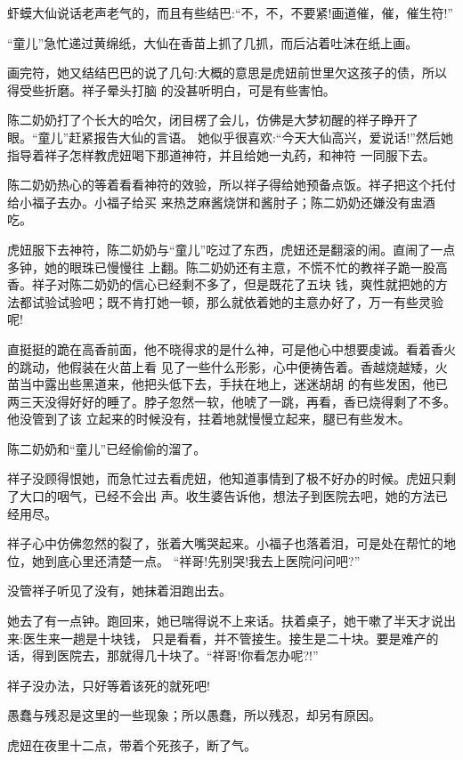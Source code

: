 \documentclass[11pt,a4paper,onecolumn]{article}
\begin{document}
虾蟆大仙说话老声老气的，而且有些结巴:``不，不，不要紧!画道催，催，催生符!''

``童儿''急忙递过黄绵纸，大仙在香苗上抓了几抓，而后沾着吐沫在纸上画。

画完符，她又结结巴巴的说了几句:大概的意思是虎妞前世里欠这孩子的债，所以得受些折磨。祥子晕头打脑
的没甚听明白，可是有些害怕。

陈二奶奶打了个长大的哈欠，闭目楞了会儿，仿佛是大梦初醒的祥子睁开了眼。``童儿''赶紧报告大仙的言语。
她似乎很喜欢:``今天大仙高兴，爱说话!''然后她指导着祥子怎样教虎妞喝下那道神符，并且给她一丸药，和神符
一同服下去。

陈二奶奶热心的等着看看神符的效验，所以祥子得给她预备点饭。祥子把这个托付给小福子去办。小福子给买
来热芝麻酱烧饼和酱肘子；陈二奶奶还嫌没有盅酒吃。

虎妞服下去神符，陈二奶奶与``童儿''吃过了东西，虎妞还是翻滚的闹。直闹了一点多钟，她的眼珠已慢慢往
上翻。陈二奶奶还有主意，不慌不忙的教祥子跪一股高香。祥子对陈二奶奶的信心已经剩不多了，但是既花了五块
钱，爽性就把她的方法都试验试验吧；既不肯打她一顿，那么就依着她的主意办好了，万一有些灵验呢!

直挺挺的跪在高香前面，他不晓得求的是什么神，可是他心中想要虔诚。看着香火的跳动，他假装在火苗上看
见了一些什么形影，心中便祷告着。香越烧越矮，火苗当中露出些黑道来，他把头低下去，手扶在地上，迷迷胡胡
的有些发困，他已两三天没得好好的睡了。脖子忽然一软，他唬了一跳，再看，香已烧得剩了不多。他没管到了该
立起来的时候没有，拄着地就慢慢立起来，腿已有些发木。

陈二奶奶和``童儿''已经偷偷的溜了。

祥子没顾得恨她，而急忙过去看虎妞，他知道事情到了极不好办的时候。虎妞只剩了大口的咽气，已经不会出
声。收生婆告诉他，想法子到医院去吧，她的方法已经用尽。

祥子心中仿佛忽然的裂了，张着大嘴哭起来。小福子也落着泪，可是处在帮忙的地位，她到底心里还清楚一点。
``祥哥!先别哭!我去上医院问问吧?''

没管祥子听见了没有，她抹着泪跑出去。

她去了有一点钟。跑回来，她已喘得说不上来话。扶着桌子，她干嗽了半天才说出来:医生来一趟是十块钱，
只是看看，并不管接生。接生是二十块。要是难产的话，得到医院去，那就得几十块了。``祥哥!你看怎办呢?!''

祥子没办法，只好等着该死的就死吧!

愚蠢与残忍是这里的一些现象；所以愚蠢，所以残忍，却另有原因。

虎妞在夜里十二点，带着个死孩子，断了气。

\pagebreak
\section{}
\end{document}
